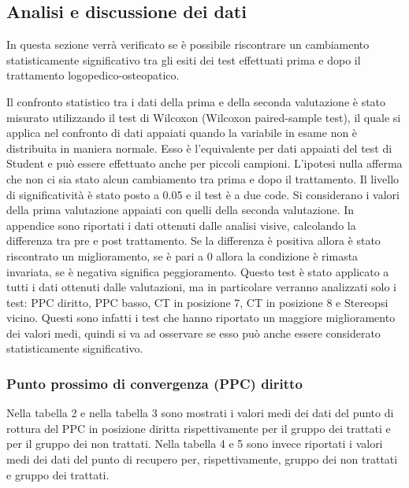  
 
\subsection{Analisi e discussione dei dati}
 
In questa sezione verrà verificato se è possibile riscontrare un cambiamento statisticamente significativo tra gli esiti dei test effettuati prima e dopo il trattamento logopedico-osteopatico.
 
Il confronto statistico tra i dati della prima e della seconda valutazione è stato misurato utilizzando il test di Wilcoxon (Wilcoxon paired-sample test), il quale si applica nel confronto di dati appaiati quando la variabile in esame non è distribuita in maniera normale. Esso è l’equivalente per dati appaiati del test di Student e può essere effettuato anche per piccoli campioni. L’ipotesi nulla afferma che non ci sia stato alcun cambiamento tra prima e dopo il trattamento. Il livello di significatività è stato posto a 0.05 e il test è a due code. Si considerano i valori della prima valutazione appaiati con quelli della seconda valutazione. In appendice sono riportati i dati ottenuti dalle analisi visive, calcolando la differenza tra pre e post trattamento. Se la differenza è positiva allora è stato riscontrato un miglioramento, se è pari a 0 allora la condizione è rimasta invariata, se è negativa significa peggioramento. Questo test è stato applicato a tutti i dati ottenuti dalle valutazioni, ma in particolare verranno analizzati solo i test: PPC diritto, PPC basso, CT in posizione 7, CT in posizione 8 e Stereopsi vicino. Questi sono infatti i test che hanno riportato un maggiore miglioramento dei valori medi, quindi si va ad osservare se esso può anche essere considerato statisticamente significativo. 
 
 
 
\subsubsection{Punto prossimo di convergenza (PPC) diritto}

Nella tabella 2 e nella tabella 3 sono mostrati i valori medi dei dati del punto di rottura del PPC in posizione diritta rispettivamente per il gruppo dei trattati e per il gruppo dei non trattati. Nella tabella 4 e 5 sono invece riportati i valori medi dei dati del punto di recupero per, rispettivamente, gruppo dei non trattati e gruppo dei trattati.
\\\ 

